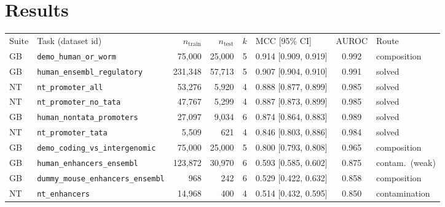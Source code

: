 \documentclass{ws-procs11x85}
\begin{document}
\section{Results}\label{results}

\begin{table}[htbp]
{\scriptsize\begin{tabular}{@{}llrrclcl@{}}
\toprule
Suite & Task (dataset id) & $n_\text{train}$ & $n_\text{test}$ & $k$ & MCC [95\% CI] & AUROC & Route\\
\colrule
GB & \texttt{demo\_human\_or\_worm} & 75{,}000 & 25{,}000 & 5 & 0.914 [0.909, 0.919] & 0.992 & composition\\
GB & \texttt{human\_ensembl\_regulatory} & 231{,}348 & 57{,}713 & 5 & 0.907 [0.904, 0.910] & 0.991 & solved\\
NT & \texttt{nt\_promoter\_all} & 53{,}276 & 5{,}920 & 4 & 0.888 [0.877, 0.899] & 0.985 & solved\\
NT & \texttt{nt\_promoter\_no\_tata} & 47{,}767 & 5{,}299 & 4 & 0.887 [0.873, 0.899] & 0.985 & solved\\
GB & \texttt{human\_nontata\_promoters} & 27{,}097 & 9{,}034 & 6 & 0.874 [0.864, 0.883] & 0.989 & solved\\
NT & \texttt{nt\_promoter\_tata} & 5{,}509 & 621 & 4 & 0.846 [0.803, 0.886] & 0.984 & solved\\
GB & \texttt{demo\_coding\_vs\_intergenomic} & 75{,}000 & 25{,}000 & 5 & 0.800 [0.793, 0.808] & 0.965 & composition\\
GB & \texttt{human\_enhancers\_ensembl} & 123{,}872 & 30{,}970 & 6 & 0.593 [0.585, 0.602] & 0.875 & contam.~(weak)\\
GB & \texttt{dummy\_mouse\_enhancers\_ensembl} & 968 & 242 & 6 & 0.529 [0.422, 0.632] & 0.858 & composition\\
NT & \texttt{nt\_enhancers} & 14{,}968 & 400 & 4 & 0.514 [0.432, 0.595] & 0.850 & contamination\\

\end{tabular}}
\end{table}
\end{document}

